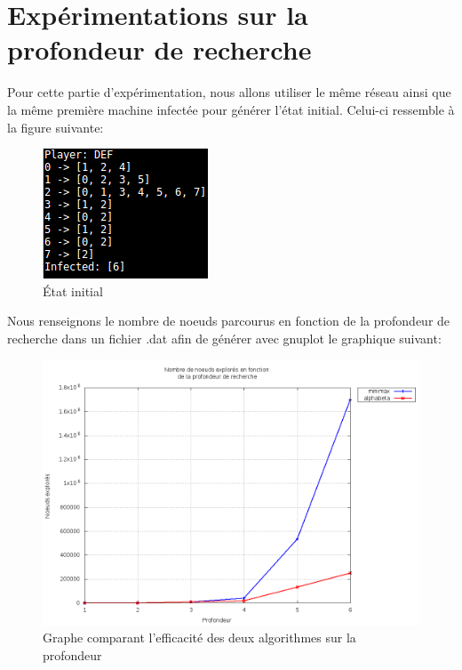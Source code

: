\documentclass[12pt, a4paper]{article}
\begin{document}
    
    \section{Expérimentations sur la profondeur de recherche}
        Pour cette partie d'expérimentation, nous allons utiliser le même réseau ainsi que la même première machine infectée pour générer l'état initial. Celui-ci ressemble à la figure suivante:
        
        \begin{figure}[h]
            \centering
            \includegraphics[scale=0.5]{img/state_init.png}
            \caption{État initial}
            \label{fig1}
        \end{figure}
        
        Nous renseignons le nombre de noeuds parcourus en fonction de la profondeur de recherche dans un fichier .dat afin de générer avec gnuplot le graphique suivant:
        
        \begin{figure}[h]
            \centering
            \includegraphics[scale=0.6]{img/graph1.png}
            \caption{Graphe comparant l'efficacité des deux algorithmes sur la profondeur}
            \label{fig2}
        \end{figure}
        
\end{document}
